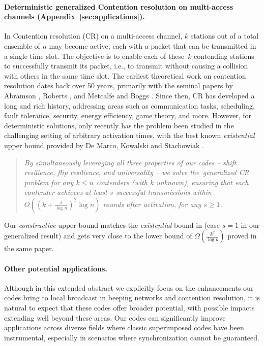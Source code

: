 \documentclass[11pt]{article}
\begin{document}
\paragraph*{Deterministic generalized Contention resolution on multi-access channels (Appendix~\ref{sec:applications}).}
In Contention resolution (CR) on a multi-access channel, $k$ stations out of a total ensemble of 
$n$ may become active,
each with a packet that can be transmitted in a single time slot. The objective is to enable each of these~$k$ contending stations to successfully transmit its packet, i.e., 
to transmit without causing a collision with others in the same time slot.
The earliest theoretical work on contention resolution dates back over 50 years, primarily with the seminal papers by Abramson \cite{Abramson}, Roberts \cite{Roberts}, and
Metcalfe and Boggs \cite{MR1976}. Since then, CR 
has developed a long and rich history, addressing areas such as communication tasks, scheduling, fault tolerance, security, energy efficiency, game theory, and more. 
However, for deterministic solutions, only recently has the problem 
been studied in the challenging setting of arbitrary activation times,
with the best known {\em existential} upper bound provided 
by De Marco, Kowalski and Stachowiak \cite{M2023}. 



\vspace*{-1ex}
\begin{quote}
{\em By simultaneously leveraging all three properties of our codes -- shift resilience, flip resilience, and universality --
we solve the~generalized CR problem for any $k\le n$ contenders (with $k$ unknown), 
ensuring that each contender achieves at least $s$ successful transmissions 
within $O((k+\frac{s}{\log n})^2\log n)$ rounds after activation, for any $s\ge 1$.}
\end{quote}

\vspace*{-1ex}
\noindent
Our \textit{constructive} upper bound matches the \textit{existential} bound in \cite{M2023} (case $s=1$ in our generalized result) 
and gets very close to the lower bound of $\Omega(\frac{k^2}{\log k})$ proved in the same paper.



\iffalse
\B
\paragraph*{Other potential applications.}
Although in this extended abstract we explicitly focus on the enhancements our codes bring to
local broadcast in beeping networks and contention resolution, it is natural to expect that these codes 
offer broader potential, with possible impacts extending well beyond these areas. Our codes can significantly 
improve applications across diverse fields where classic superimposed codes have been instrumental, 
especially in scenarios where synchronization cannot be guaranteed.
\end{document}
